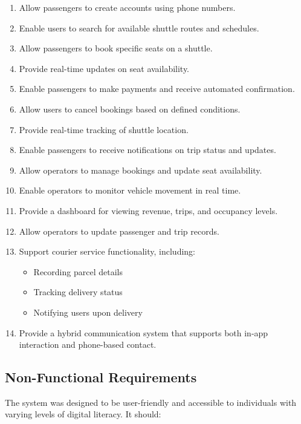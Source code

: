 \begin{enumerate}
 \item Allow passengers to create accounts using phone numbers.
 \item Enable users to search for available shuttle routes and schedules.
 \item Allow passengers to book specific seats on a shuttle.
 \item Provide real-time updates on seat availability.
 \item Enable passengers to make payments and receive automated
confirmation.

 \item Allow users to cancel bookings based on defined conditions.
 \item Provide real-time tracking of shuttle location.
 \item Enable passengers to receive notifications on trip status and
updates.

 \item Allow operators to manage bookings and update seat availability.
 \item Enable operators to monitor vehicle movement in real time.
 \item Provide a dashboard for viewing revenue, trips, and occupancy
levels.

 \item Allow operators to update passenger and trip records.
 \item Support courier service functionality, including:
        \begin{itemize}
 \item Recording parcel details
 \item Tracking delivery status
 \item Notifying users upon delivery
        \end{itemize}
 \item Provide a hybrid communication system that supports both in-app
interaction and phone-based contact.

\end{enumerate}

\subsection{Non-Functional Requirements}

The system was designed to be user-friendly and accessible to individuals with
varying levels of digital literacy. It should:



